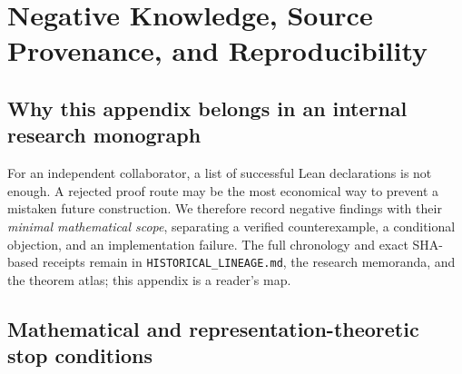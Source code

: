 \chapter[Negative Knowledge and Reproducibility]{Negative Knowledge, Source Provenance, and Reproducibility}
\label{app:negative-knowledge}

\section{Why this appendix belongs in an internal research monograph}

For an independent collaborator, a list of successful Lean declarations
is not enough. A rejected proof route may be the most economical way
to prevent a mistaken future construction. We therefore record
negative findings with their \emph{minimal mathematical scope},
separating a verified counterexample, a conditional objection, and
an implementation failure. The full chronology and exact SHA-based
receipts remain in \texttt{HISTORICAL\_LINEAGE.md}, the research
memoranda, and the theorem atlas; this appendix is a reader's map.

\section{Mathematical and representation-theoretic stop conditions}

